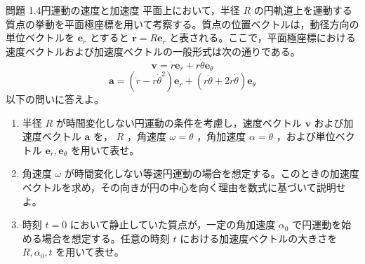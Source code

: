 \problemstart
{}

\begin{problemBox}{問題 1.4\quad 円運動の速度と加速度\hspace{1.2em}{\small\mdseries 〔基本〕}}
平面上において，半径 $R$ の円軌道上を運動する質点の挙動を平面極座標を用いて考察する。質点の位置ベクトルは，動径方向の単位ベクトルを $\boldsymbol{e}_r$ とすると $\boldsymbol{r} = R \boldsymbol{e}_r$ と表される。ここで，平面極座標における速度ベクトルおよび加速度ベクトルの一般形式は次の通りである。
\begin{equation*}
\boldsymbol{v} = \dot{r} \boldsymbol{e}_r + r \dot{\theta} \boldsymbol{e}_\theta
\end{equation*}
\begin{equation*}
\boldsymbol{a} = (\ddot{r} - r \dot{\theta}^2) \boldsymbol{e}_r + (r \ddot{\theta} + 2 \dot{r} \dot{\theta}) \boldsymbol{e}_\theta
\end{equation*}
以下の問いに答えよ。

\begin{enumerate}
  \item 半径 $R$ が時間変化しない円運動の条件を考慮し，速度ベクトル $\boldsymbol{v}$ および加速度ベクトル $\boldsymbol{a}$ を， $R$ ，角速度 $\omega = \dot{\theta}$ ，角加速度 $\alpha = \ddot{\theta}$ ，および単位ベクトル $\boldsymbol{e}_r, \boldsymbol{e}_\theta$ を用いて表せ。

  \item 角速度 $\omega$ が時間変化しない等速円運動の場合を想定する。このときの加速度ベクトルを求め，その向きが円の中心を向く理由を数式に基づいて説明せよ。

  \item 時刻 $t = 0$ において静止していた質点が，一定の角加速度 $\alpha_0$ で円運動を始める場合を想定する。任意の時刻 $t$ における加速度ベクトルの大きさを $R, \alpha_0, t$ を用いて表せ。
\end{enumerate}
\end{problemBox}

